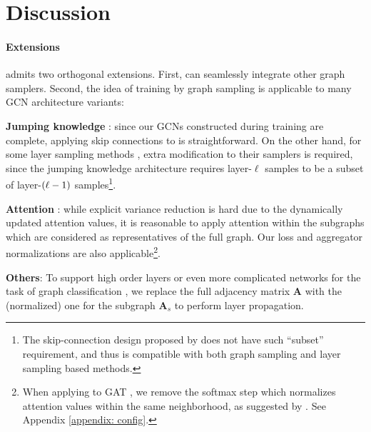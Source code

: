 \section{Discussion\label{sec: discussion}}



\paragraph{Extensions} %
{\graphsaint} admits two orthogonal extensions. 
First, {\graphsaint} can seamlessly integrate other graph samplers. 
Second, the idea of training by graph sampling is applicable to many GCN architecture variants:
\begin{enumerate*}
\item \textbf{Jumping knowledge} \citep{jk-net}: since our GCNs constructed during training are complete, applying skip connections to {\graphsaint} is straightforward. On the other hand, for some layer sampling methods \citep{fastgcn,as-gcn}, extra modification to their samplers is required, since the jumping knowledge architecture requires layer-$\ell$ samples to be a subset of layer-$\left( \ell-1 \right)$ samples\footnote{The skip-connection design proposed by \cite{as-gcn} does not have such ``subset'' requirement, and thus is compatible with both graph sampling and layer sampling based methods.}. 
\item \textbf{Attention} \citep{gat,dna,gaan}: while explicit variance reduction is hard due to the dynamically updated attention values, it is reasonable to apply attention within the subgraphs which are considered as representatives of the full graph. Our loss and aggregator normalizations are also applicable\footnote{When applying {\graphsaint} to GAT \citep{gat}, we remove the softmax step which normalizes attention values within the same neighborhood, as suggested by \cite{as-gcn}. See Appendix \ref{appendix: config}.}.
\item \textbf{Others}: To support high order layers \citep{high-order-1,high-order-2,high-order-3} or even more complicated networks for the task of graph classification \citep{diff-pool}, we replace the full adjacency matrix $\bm{A}$ with the (normalized) one for the subgraph $\bm{A}_s$ to perform layer propagation. 
\end{enumerate*}



